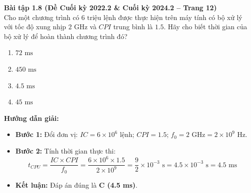 \textbf{Bài tập 1.8 (Đề Cuối kỳ 2022.2 \& Cuối kỳ 2024.2 -- Trang 12)}\\
Cho một chương trình có $6\text{ triệu lệnh}$ được thực hiện trên máy tính có bộ xử lý với tốc độ xung nhịp $2\text{ GHz}$ và $CPI$ trung bình là $1.5$. Hãy cho biết thời gian của bộ xử lý để hoàn thành chương trình đó?
\begin{enumerate}[label=\Alph*.]
    \item $72\text{ ms}$
    \item $450\text{ ms}$
    \item $4.5\text{ ms}$
    \item $45\text{ ms}$
\end{enumerate}
\textbf{Hướng dẫn giải:}
\begin{itemize}
    \item \textbf{Bước 1:} Đổi đơn vị: $IC = 6 \times 10^6\text{ lệnh}$; $CPI = 1.5$; $f_0 = 2\text{ GHz} = 2 \times 10^9\text{ Hz}$.
    \item \textbf{Bước 2:} Tính thời gian thực thi:
    $$t_{CPU} = \frac{IC \times CPI}{f_0} = \frac{6 \times 10^6 \times 1.5}{2 \times 10^9} = \frac{9}{2} \times 10^{-3}\text{ s} = 4.5 \times 10^{-3}\text{ s} = 4.5\text{ ms}$$
    \item \textbf{Kết luận:} Đáp án đúng là \textbf{C (4.5 ms)}.
\end{itemize}

